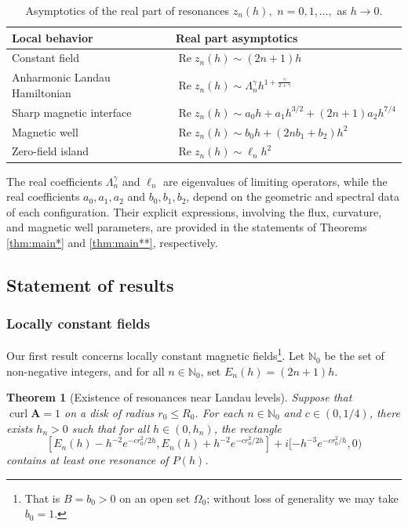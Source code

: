\documentclass[11pt]{amsart}
\newtheorem{theorem}{Theorem}[section]
\theoremstyle{remark}
\newcommand{\bA}{\mathbf{A}}
\DeclareMathOperator{\Curl}{curl}
\numberwithin{equation}{section}
\begin{document}
\begin{table}[htbp]
\centering
\caption{Asymptotics of the real part of resonances $z_n(h),$ $n=0,1,\dots,$ as $h\to0$.}
\label{tab:resonance-expansions}
\begin{tabular}{@{}p{} p{}@{}}
\toprule
\textbf{Local behavior} & \textbf{Real part asymptotics} \\
\midrule
Constant field & $\operatorname{Re} z_n(h)\sim (2n+1)h$ \\
Anharmonic Landau Hamiltonian& $\operatorname{Re} z_n(h)\sim \Lambda_n^\gamma h^{1+\frac{\gamma}{2+\gamma}}$ \\
Sharp magnetic interface & $\operatorname{Re} z_n(h)\sim a_0 h + a_1 h^{3/2} + (2n+1)a_2 h^{7/4}$ \\
Magnetic well & $\operatorname{Re} z_n(h)\sim b_0 h + (2n b_1+b_2) h^2$ \\
Zero-field island& $\operatorname{Re} z_n(h)\sim \ell_n h^2$ \\
\bottomrule
\end{tabular}
\end{table}

The real coefficients $\Lambda_n^\gamma$ and $\ell_n$ are eigenvalues of limiting operators, while the real coefficients $a_0,a_1,a_2$ and $b_0,b_1,b_2$,  depend on the geometric and spectral data of each configuration. Their explicit expressions, involving the flux, curvature, and magnetic well parameters, are provided in the statements of Theorems \ref{thm:main*} and \ref{thm:main**}, respectively.

\subsection{Statement of results}

\subsubsection*{Locally constant fields}

Our first result concerns locally constant magnetic fields\footnote{That is $B=b_0>0$ on an open set $\Omega_0$;  without loss of generality we may take $b_0=1$.}. Let $\mathbb{N}_0$ be the set of non-negative integers, and for all $n\in\mathbb N_0$, set $E_n(h)=(2n+1)h$. 


\begin{theorem}[Existence of resonances near Landau levels]\label{thm:main}
Suppose that $\Curl\bA=1$ on a disk of radius $r_0\leq R_0$. For each  $n \in \mathbb{N}_0$ and $c\in(0,1/4)$, there exists $h_n > 0$ such that for all $h \in(0, h_n)$, the rectangle
\[
 [E_n(h) - h^{-2}e^{-cr_0^2/2h}, E_n(h) + h^{-2}e^{-cr_0^2/2h}] + i[-h^{-3}e^{-c r_0^2/h}, 0)
\]
contains at least one resonance of $P(h)$.
\end{theorem}
\end{document}
